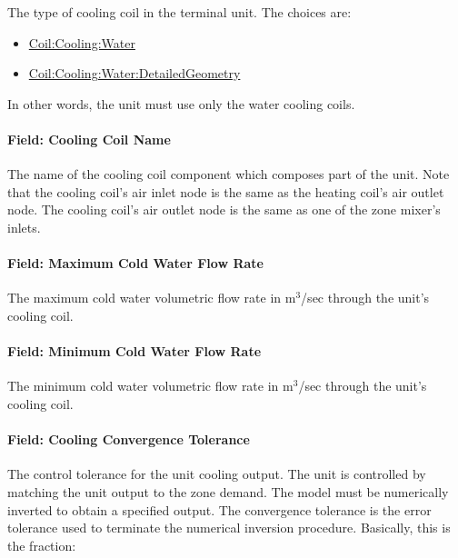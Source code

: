 The type of cooling coil in the terminal unit. The choices are:

\begin{itemize}
\item
  \hyperref[coilcoolingwater]{Coil:Cooling:Water}
\item
  \hyperref[coilcoolingwaterdetailedgeometry]{Coil:Cooling:Water:DetailedGeometry}
\end{itemize}

In other words, the unit must use only the water cooling coils.

\paragraph{Field: Cooling Coil Name}\label{field-cooling-coil-name}

The name of the cooling coil component which composes part of the unit. Note that the cooling coil's air inlet node is the same as the heating coil's air outlet node. The cooling coil's air outlet node is the same as one of the zone mixer's inlets.

\paragraph{Field: Maximum Cold Water Flow Rate}\label{field-maximum-cold-water-flow-rate}

The maximum cold water volumetric flow rate in m\(^{3}\)/sec through the unit's cooling coil.

\paragraph{Field: Minimum Cold Water Flow Rate}\label{field-minimum-cold-water-flow-rate}

The minimum cold water volumetric flow rate in m\(^{3}\)/sec through the unit's cooling coil.

\paragraph{Field: Cooling Convergence Tolerance}\label{field-cooling-convergence-tolerance}

The control tolerance for the unit cooling output. The unit is controlled by matching the unit output to the zone demand. The model must be numerically inverted to obtain a specified output. The convergence tolerance is the error tolerance used to terminate the numerical inversion procedure. Basically, this is the fraction:

